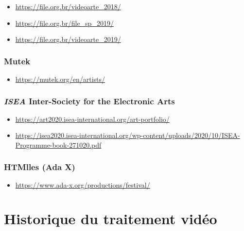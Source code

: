 \documentclass[
  french,
]{book}
\providecommand{\tightlist}{%
  \setlength{\itemsep}{0pt}\setlength{\parskip}{0pt}}
\begin{document}
\begin{itemize}
\tightlist
\item
  \url{https://file.org.br/videoarte_2018/}
\item
  \url{https://file.org.br/file_sp_2019/}
\item
  \url{https://file.org.br/videoarte_2019/}
\end{itemize}

\hypertarget{mutek}{%
\subsection{Mutek}\label{mutek}}

\begin{itemize}
\tightlist
\item
  \url{https://mutek.org/en/artists/}
\end{itemize}

\hypertarget{isea-inter-society-for-the-electronic-arts}{%
\subsection{\texorpdfstring{\emph{ISEA} Inter-Society for the Electronic Arts}{ISEA Inter-Society for the Electronic Arts}}\label{isea-inter-society-for-the-electronic-arts}}

\begin{itemize}
\tightlist
\item
  \url{https://art2020.isea-international.org/art-portfolio/}
\item
  \url{https://isea2020.isea-international.org/wp-content/uploads/2020/10/ISEA-Programme-book-271020.pdf}
\end{itemize}

\hypertarget{htmlles-ada-x}{%
\subsection{HTMlles (Ada X)}\label{htmlles-ada-x}}

\begin{itemize}
\tightlist
\item
  \url{https://www.ada-x.org/productions/festival/}
\end{itemize}

\hypertarget{historique}{%
\chapter{Historique du traitement vidéo}\label{historique}}
\end{document}
